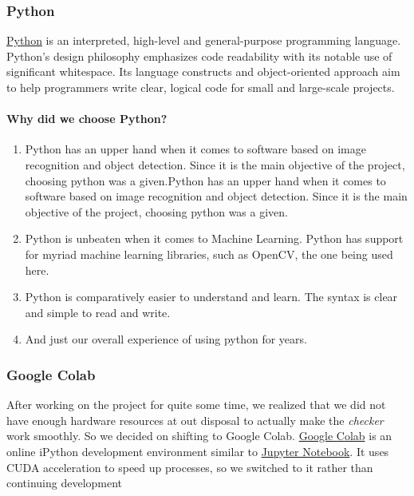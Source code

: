 \documentclass[a4paper]{article}
\begin{document}
\subsubsection{Python}
\href{https://www.python.org/}{Python} is an interpreted, high-level and general-purpose programming language.
Python's design philosophy emphasizes code readability with its notable use of
significant whitespace. Its language constructs and object-oriented approach aim
to help programmers write clear, logical code for small and large-scale projects.

\paragraph{Why did we choose Python?}
\begin{enumerate}
    \item Python has an upper hand when it comes to software based on
          image recognition and object detection. Since it is the main
          objective of the project, choosing python was a given.Python has an upper hand when it comes to software based on
          image recognition and object detection. Since it is the main
          objective of the project, choosing python was a given.
    \item Python is unbeaten when it comes to Machine Learning. Python has
          support for myriad machine learning libraries, such as OpenCV, the
          one being used here.
    \item Python is comparatively easier to understand and learn. The syntax
          is clear and simple to read and write.
    \item And just our overall experience of using python for years.
\end{enumerate}

\subsubsection{Google Colab}
After working on the project for quite some time, we realized that we did
not have enough hardware resources at out disposal to actually make the
\textit{checker} work smoothly. So we decided on shifting to Google Colab.
\href{https://colab.research.google.com/notebooks/intro.ipynb}{Google Colab} is an online iPython development environment similar to
\href{https://jupyter.org/}{Jupyter Notebook}. It uses CUDA acceleration to speed up processes, so we
switched to it rather than continuing development
\end{document}
